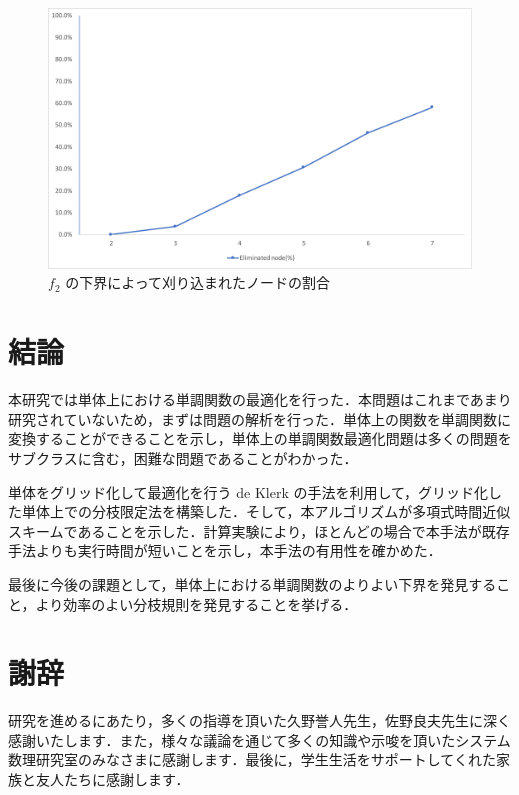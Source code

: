 \documentclass[a4paper,11pt]{jreport}
\begin{document}
\begin{figure}[h]
\begin{center}
\includegraphics[width=13.5cm]{graphs/f_2_eliminated.pdf}
\caption{$ f_2 $ の下界によって刈り込まれたノードの割合}
\label{fig:f_2_eliminated}
\end{center}
\end{figure}

\chapter{結論}

本研究では単体上における単調関数の最適化を行った．本問題はこれまであまり研究されていないため，まずは問題の解析を行った．単体上の関数を単調関数に変換することができることを示し，単体上の単調関数最適化問題は多くの問題をサブクラスに含む，困難な問題であることがわかった．\par
単体をグリッド化して最適化を行う de Klerk の手法を利用して，グリッド化した単体上での分枝限定法を構築した．そして，本アルゴリズムが多項式時間近似スキームであることを示した．計算実験により，ほとんどの場合で本手法が既存手法よりも実行時間が短いことを示し，本手法の有用性を確かめた．\par
最後に今後の課題として，単体上における単調関数のよりよい下界を発見すること，より効率のよい分枝規則を発見することを挙げる．\par

\chapter*{謝辞}

研究を進めるにあたり，多くの指導を頂いた久野誉人先生，佐野良夫先生に深く感謝いたします．また，様々な議論を通じて多くの知識や示唆を頂いたシステム数理研究室のみなさまに感謝します．最後に，学生生活をサポートしてくれた家族と友人たちに感謝します．
\end{document}
